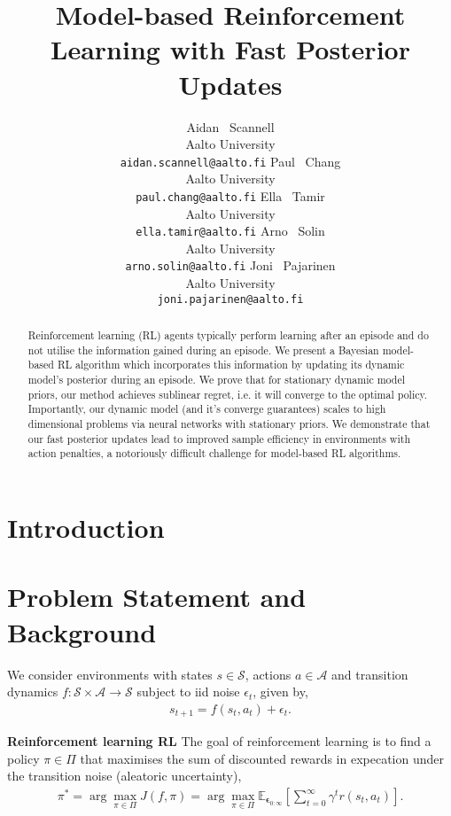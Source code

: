 \documentclass{article}
\title{Model-based Reinforcement Learning with Fast Posterior Updates}
\author{%
  Aidan ~Scannell \\
  Aalto University\\
  \texttt{aidan.scannell@aalto.fi}
  \And
  Paul ~Chang \\
  Aalto University\\
  \texttt{paul.chang@aalto.fi}
  \And
  Ella ~Tamir \\
  Aalto University\\
  \texttt{ella.tamir@aalto.fi}
  \And
  Arno ~Solin \\
  Aalto University\\
  \texttt{arno.solin@aalto.fi}
  \And
  Joni ~Pajarinen \\
  Aalto University\\
  \texttt{joni.pajarinen@aalto.fi}
}
\begin{document}
\maketitle

\begin{abstract}
  Reinforcement learning (RL) agents typically perform learning after an episode and do not utilise the information gained during an episode.
  We present a Bayesian model-based RL algorithm which incorporates this information by updating its dynamic model's posterior during an episode.
  We prove that for stationary dynamic model priors, our method achieves sublinear regret, i.e. it will converge to the optimal policy.
  Importantly, our dynamic model (and it's converge guarantees) scales to high dimensional problems via neural networks with stationary priors.
  We demonstrate that our fast posterior updates lead to improved sample efficiency in environments with action penalties, a notoriously difficult
  challenge for model-based RL algorithms.

\end{abstract}

\section{Introduction} \label{sec:intro}

\section{Problem Statement and Background} \label{sec:problem-statement}
We consider environments with states \(s \in \mathcal{S}\), actions \(a \in \mathcal{A}\) and transition dynamics \(f: \mathcal{S} \times \mathcal{A} \rightarrow \mathcal{S}\) subject to
iid noise \(\epsilon_{t}\), given by,
\begin{align}
s_{t+1} = f(s_{t}, a_{t}) + \epsilon_{t}.
\end{align}

\textbf{Reinforcement learning RL}
The goal of reinforcement learning is to find a policy \(\pi \in \Pi\) that maximises the sum of discounted
rewards in expecation under the transition noise (aleatoric uncertainty),
\begin{align} \label{eq-model-free-objective}
\pi^{*} = \arg \max_{\pi \in \Pi} J(f, \pi) = \arg \max_{\pi \in \Pi} \mathbb{E}_{\bm\epsilon_{0:\infty}} \left[ \sum_{t=0}^{\infty} \gamma^{t} r(s_{t},a_{t}) \right].
\end{align}
\end{document}
